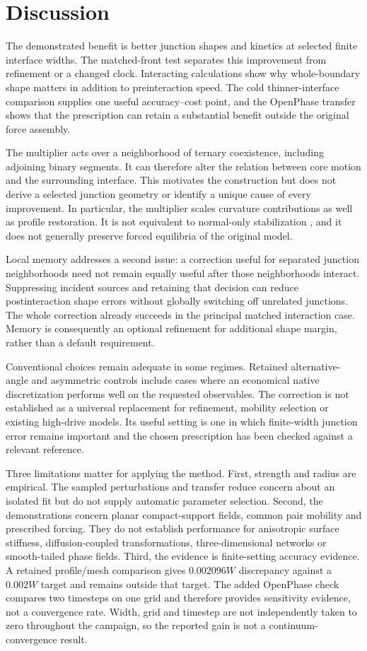 \section{Discussion}
The demonstrated benefit is better junction shapes and kinetics at selected finite interface widths. The matched-front test separates this improvement from refinement or a changed clock. Interacting calculations show why whole-boundary shape matters in addition to preinteraction speed. The cold thinner-interface comparison supplies one useful accuracy--cost point, and the OpenPhase transfer shows that the prescription can retain a substantial benefit outside the original force assembly.

The multiplier acts over a neighborhood of ternary coexistence, including adjoining binary segments. It can therefore alter the relation between core motion and the surrounding interface. This motivates the construction but does not derive a selected junction geometry or identify a unique cause of every improvement. In particular, the multiplier scales curvature contributions as well as profile restoration. It is not equivalent to normal-only stabilization \citep{feyen2023}, and it does not generally preserve forced equilibria of the original model.

Local memory addresses a second issue: a correction useful for separated junction neighborhoods need not remain equally useful after those neighborhoods interact. Suppressing incident sources and retaining that decision can reduce postinteraction shape errors without globally switching off unrelated junctions. The whole correction already succeeds in the principal matched interaction case. Memory is consequently an optional refinement for additional shape margin, rather than a default requirement.

Conventional choices remain adequate in some regimes. Retained alternative-angle and asymmetric controls include cases where an economical native discretization performs well on the requested observables. The correction is not established as a universal replacement for refinement, mobility selection or existing high-drive models. Its useful setting is one in which finite-width junction error remains important and the chosen prescription has been checked against a relevant reference.

Three limitations matter for applying the method. First, strength and radius are empirical. The sampled perturbations and transfer reduce concern about an isolated fit but do not supply automatic parameter selection. Second, the demonstrations concern planar compact-support fields, common pair mobility and prescribed forcing. They do not establish performance for anisotropic surface stiffness, diffusion-coupled transformations, three-dimensional networks or smooth-tailed phase fields. Third, the evidence is finite-setting accuracy evidence. A retained profile/mesh comparison gives $0.002096W$ discrepancy against a $0.002W$ target and remains outside that target. The added OpenPhase check compares two timesteps on one grid and therefore provides sensitivity evidence, not a convergence rate. Width, grid and timestep are not independently taken to zero throughout the campaign, so the reported gain is not a continuum-convergence result.

